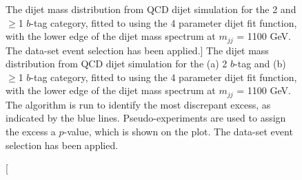 \begin{figure}[!ht]
  \begin{center}
   \captionsetup[subfigure]{aboveskip=0pt,justification=centering}
  \end{center}
  \vspace{-1em}
  \caption
      [The dijet mass distribution from QCD dijet simulation for the 2 and $\geq$1 $b$-tag category,
        fitted to using the 4 parameter dijet fit function, with the lower edge of the dijet mass spectrum at $m_{jj}$ = 1100 GeV.
        The \summer{} data-set event selection has been applied.]
      {The dijet mass distribution from QCD dijet simulation for the (a) 2 $b$-tag and (b) $\geq$1 $b$-tag category,
        fitted to using the 4 parameter dijet fit function, with the lower edge of the dijet mass spectrum at $m_{jj}$ = 1100 GeV.
        The \bh{} algorithm is run to identify the most discrepant excess, as indicated by the blue lines.
        Pseudo-experiments are used to assign the excess a \mbox{$p$-value}, which is shown on the plot.    
        The \summer{} data-set event selection has been applied.}
 \label{fig:Short_4para_1100_figure1}
\end{figure}
%
%
